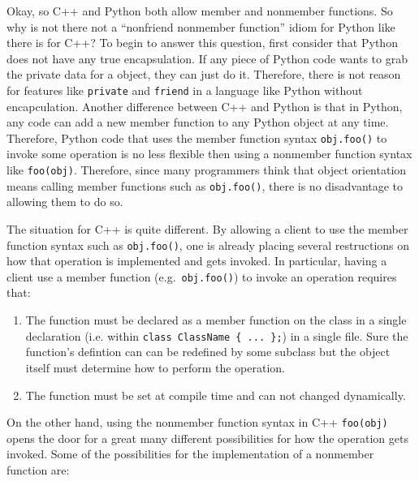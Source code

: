 \documentclass[pdf,ps2pdf,11pt]{SANDreport}
\begin{document}
Okay, so C++ and Python both allow member and nonmember functions. So why is
not there not a ``nonfriend nonmember function'' idiom for Python like there
is for C++?  To begin to answer this question, first consider that Python does
not have any true encapsulation.  If any piece of Python code wants to grab
the private data for a object, they can just do it.  Therefore, there is not
reason for features like {}\texttt{private} and {}\texttt{friend} in a
language like Python without encapculation.  Another difference between C++
and Python is that in Python, any code can add a new member function to any
Python object at any time.  Therefore, Python code that uses the member
function syntax {}\texttt{obj.foo()} to invoke some operation is no less
flexible then using a nonmember function syntax like {}\texttt{foo(obj)}.
Therefore, since many programmers think that object orientation means calling
member functions such as {}\texttt{obj.foo()}, there is no disadvantage to
allowing them to do so.

The situation for C++ is quite different.  By allowing a client to use the
member function syntax such as {}\texttt{obj.foo()}, one is already placing
several restructions on how that operation is implemented and gets invoked.
In particular, having a client use a member function (e.g.\
{}\texttt{obj.foo()}) to invoke an operation requires that:

\begin{enumerate}

{}\item{}The function must be declared as a member function on the class in a
single declaration (i.e. within {}\texttt{class ClassName \{ ... \};}) in a
single file.  Sure the function's defintion can can be redefined by some
subclass but the object itself must determine how to perform the operation.

{}\item{}The function must be set at compile time and can not changed
dynamically.

\end{enumerate}

On the other hand, using the nonmember function syntax in C++
{}\texttt{foo(obj)} opens the door for a great many different possibilities
for how the operation gets invoked.  Some of the possibilities for the
implementation of a nonmember function are:
\end{document}
